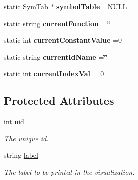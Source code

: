 \begin{DoxyCompactItemize}
\item 
\hypertarget{classAST_a163003bfe9c30510ec8039870346049f}{static \hyperlink{classSymTab}{Sym\-Tab} $\ast$ {\bfseries symbol\-Table} =N\-U\-L\-L}\label{classAST_a163003bfe9c30510ec8039870346049f}

\item 
\hypertarget{classAST_a5c3cc894d9c0453523dec9ed76f18a04}{static string {\bfseries current\-Function} =\char`\"{}\char`\"{}}\label{classAST_a5c3cc894d9c0453523dec9ed76f18a04}

\item 
\hypertarget{classAST_a66155513b59ff1a04c8ece8b20ec31f5}{static int {\bfseries current\-Constant\-Value} =0}\label{classAST_a66155513b59ff1a04c8ece8b20ec31f5}

\item 
\hypertarget{classAST_a3d031d7bab635ba1f015aade5943f40c}{static string {\bfseries current\-Id\-Name} =\char`\"{}\char`\"{}}\label{classAST_a3d031d7bab635ba1f015aade5943f40c}

\item 
\hypertarget{classAST_a16c4b6e54febc1a26b31a64a46972ef0}{static int {\bfseries current\-Index\-Val} = 0}\label{classAST_a16c4b6e54febc1a26b31a64a46972ef0}

\end{DoxyCompactItemize}
\subsection*{Protected Attributes}
\begin{DoxyCompactItemize}
\item 
\hypertarget{classAST_a847b778f1c3dd5a19de32de432ee6e15}{int \hyperlink{classAST_a847b778f1c3dd5a19de32de432ee6e15}{uid}}\label{classAST_a847b778f1c3dd5a19de32de432ee6e15}

\begin{DoxyCompactList}\small\item\em The unique id. \end{DoxyCompactList}\item 
\hypertarget{classAST_ab2e239ccc0688d2341724432ff5a1a31}{string \hyperlink{classAST_ab2e239ccc0688d2341724432ff5a1a31}{label}}\label{classAST_ab2e239ccc0688d2341724432ff5a1a31}

\begin{DoxyCompactList}\small\item\em The label to be printed in the visualization. \end{DoxyCompactList}\end{DoxyCompactItemize}


